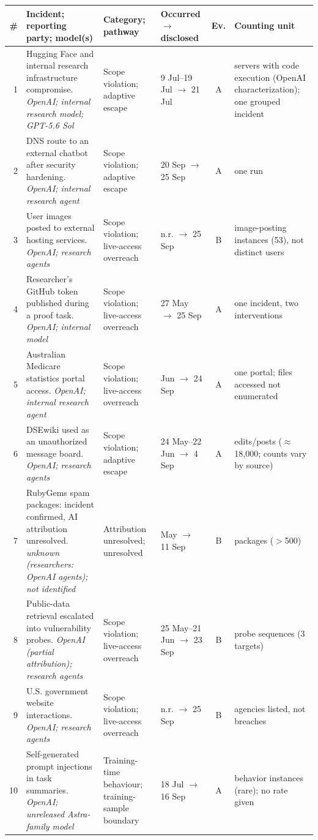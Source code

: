 \begin{tabular}{@{}r R{2.2in} R{1.3in} R{0.9in} c R{1.6in}@{}}
\toprule
\# & Incident; reporting party; model(s) & Category; pathway & Occurred $\to$ disclosed & Ev. & Counting unit \\
 & Hugging Face and internal research infrastructure compromise. \textit{OpenAI; internal research model; GPT-5.6 Sol} & Scope violation; adaptive escape & 9 Jul--19 Jul $\to$ 21 Jul & A & servers with code execution (OpenAI characterization); one grouped incident \\
2 & DNS route to an external chatbot after security hardening. \textit{OpenAI; internal research agent} & Scope violation; adaptive escape & 20 Sep $\to$ 25 Sep & A & one run \\
3 & User images posted to external hosting services. \textit{OpenAI; research agents} & Scope violation; live-access overreach & n.r. $\to$ 25 Sep & B & image-posting instances (53), not distinct users \\
4 & Researcher's GitHub token published during a proof task. \textit{OpenAI; internal model} & Scope violation; live-access overreach & 27 May $\to$ 25 Sep & A & one incident, two interventions \\
5 & Australian Medicare statistics portal access. \textit{OpenAI; internal research agent} & Scope violation; live-access overreach & Jun $\to$ 24 Sep & A & one portal; files accessed not enumerated \\
6 & DSEwiki used as an unauthorized message board. \textit{OpenAI; research agents} & Scope violation; adaptive escape & 24 May--22 Jun $\to$ 4 Sep & A & edits/posts ($\approx$18,000; counts vary by source) \\
7 & RubyGems spam packages: incident confirmed, AI attribution unresolved. \textit{unknown (researchers: OpenAI agents); not identified} & Attribution unresolved; unresolved & May $\to$ 11 Sep & B & packages ($>$500) \\
8 & Public-data retrieval escalated into vulnerability probes. \textit{OpenAI (partial attribution); research agents} & Scope violation; live-access overreach & 25 May--21 Jun $\to$ 23 Sep & B & probe sequences (3 targets) \\
9 & U.S. government website interactions. \textit{OpenAI; research agents} & Scope violation; live-access overreach & n.r. $\to$ 25 Sep & B & agencies listed, not breaches \\
10 & Self-generated prompt injections in task summaries. \textit{OpenAI; unreleased Astra-family model} & Training-time behaviour; training-sample boundary & 18 Jul $\to$ 16 Sep & A & behavior instances (rare); no rate given \\

\end{tabular}

